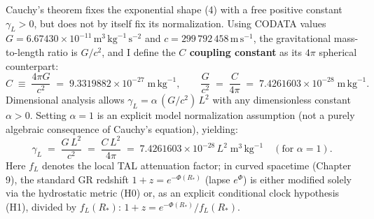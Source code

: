 \documentclass[10pt,a4paper]{article}
\begin{document}
\par
Cauchy's theorem fixes the exponential shape (4) with a free positive constant $\gamma_L > 0$, but does not by itself fix its normalization. Using CODATA values $G = 6.67430\times 10^{-11}\,\text{m}^3\,\text{kg}^{-1}\,\text{s}^{-2}$ and $c = 299\,792\,458\,\text{m}\,\text{s}^{-1}$, the gravitational mass-to-length ratio is $G/c^2$, and I define the \textbf{$C$ coupling constant} as its $4\pi$ spherical counterpart:
\begin{equation}
  C \;\equiv\; \frac{4\pi G}{c^2} \;=\; 9.3319882\times 10^{-27}\;\text{m}\,\text{kg}^{-1}, \qquad
  \frac{G}{c^2} \;=\; \frac{C}{4\pi} \;=\; 7.4261603\times 10^{-28}\;\text{m}\,\text{kg}^{-1}.
\end{equation}
Dimensional analysis allows $\gamma_L = \alpha\,(G/c^2)\,L^2$ with any dimensionless constant $\alpha > 0$. Setting $\alpha = 1$ is an explicit model normalization assumption (not a purely algebraic consequence of Cauchy's equation), yielding:
\begin{equation}
  \gamma_L \;=\; \frac{G\,L^2}{c^2} \;=\; \frac{C\,L^2}{4\pi} \;=\; 7.4261603\times 10^{-28}\,L^2\;\text{m}^3\,\text{kg}^{-1}\quad(\text{for }\alpha=1).
\end{equation}
Here $f_L$ denotes the local TAL attenuation factor; in curved spacetime (Chapter 9), the standard GR redshift $1+z = e^{-\Phi(R_*)}$ (lapse $e^{\Phi}$) is either modified solely via the hydrostatic metric (H0) or, as an explicit conditional clock hypothesis (H1), divided by $f_L(R_*)$: $1+z = e^{-\Phi(R_*)}/f_L(R_*)$.
\end{document}
